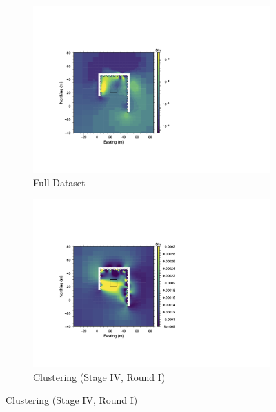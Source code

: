 \documentclass[final,authoryear,5p,times,twocolumn]{elsarticle}
\begin{document}
\begin{figure}[!ht]
   \centering

   \begin{subfigure}[b]{0.475\linewidth}
       \centering
       \includegraphics[trim=3.35cm 3.6cm 11.95cm 5.4cm, clip=true, width=\linewidth]{./Figures/Fig23a.png}
       \caption{Full Dataset}
       \label{fig:Synth_Horseshoe_BadCable_Full}
   \end{subfigure}
   \hfill
   \begin{subfigure}[b]{0.475\linewidth}
       \centering
       \includegraphics[trim=3.35cm 3.6cm 11.95cm 5.4cm, clip=true, width=\linewidth]{./Figures/Fig23b.png}
       \caption{Clustering (Stage IV, Round I)}
       \label{fig:Synth_Horseshoe_BadCable_ClustStg2}
   \end{subfigure}


\end{figure}
\end{document}
